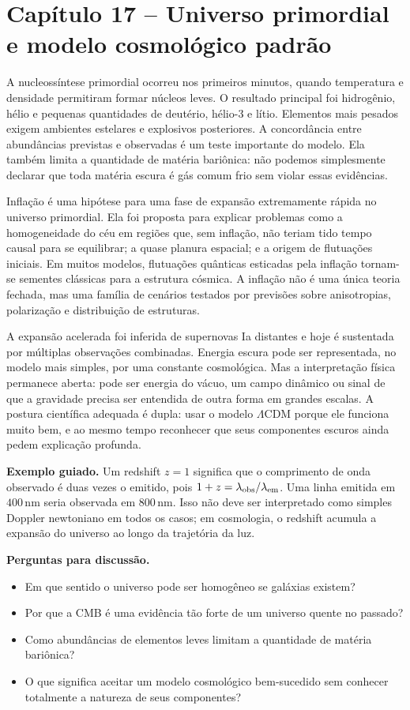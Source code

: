 \documentclass[11pt,a4paper]{article}
\begin{document}
\section*{Capítulo 17 -- Universo primordial e modelo cosmológico padrão}
A nucleossíntese primordial ocorreu nos primeiros minutos, quando temperatura e densidade permitiram formar núcleos leves. O resultado principal foi hidrogênio, hélio e pequenas quantidades de deutério, hélio-3 e lítio. Elementos mais pesados exigem ambientes estelares e explosivos posteriores. A concordância entre abundâncias previstas e observadas é um teste importante do modelo. Ela também limita a quantidade de matéria bariônica: não podemos simplesmente declarar que toda matéria escura é gás comum frio sem violar essas evidências.

Inflação é uma hipótese para uma fase de expansão extremamente rápida no universo primordial. Ela foi proposta para explicar problemas como a homogeneidade do céu em regiões que, sem inflação, não teriam tido tempo causal para se equilibrar; a quase planura espacial; e a origem de flutuações iniciais. Em muitos modelos, flutuações quânticas esticadas pela inflação tornam-se sementes clássicas para a estrutura cósmica. A inflação não é uma única teoria fechada, mas uma família de cenários testados por previsões sobre anisotropias, polarização e distribuição de estruturas.

A expansão acelerada foi inferida de supernovas Ia distantes e hoje é sustentada por múltiplas observações combinadas. Energia escura pode ser representada, no modelo mais simples, por uma constante cosmológica. Mas a interpretação física permanece aberta: pode ser energia do vácuo, um campo dinâmico ou sinal de que a gravidade precisa ser entendida de outra forma em grandes escalas. A postura científica adequada é dupla: usar o modelo $\Lambda$CDM porque ele funciona muito bem, e ao mesmo tempo reconhecer que seus componentes escuros ainda pedem explicação profunda.

\textbf{Exemplo guiado.} Um redshift $z=1$ significa que o comprimento de onda observado é duas vezes o emitido, pois $1+z=\lambda_{\rm obs}/\lambda_{\rm em}$. Uma linha emitida em $400\,\mathrm{nm}$ seria observada em $800\,\mathrm{nm}$. Isso não deve ser interpretado como simples Doppler newtoniano em todos os casos; em cosmologia, o redshift acumula a expansão do universo ao longo da trajetória da luz.

\textbf{Perguntas para discussão.}
\begin{itemize}
\item Em que sentido o universo pode ser homogêneo se galáxias existem?
\item Por que a CMB é uma evidência tão forte de um universo quente no passado?
\item Como abundâncias de elementos leves limitam a quantidade de matéria bariônica?
\item O que significa aceitar um modelo cosmológico bem-sucedido sem conhecer totalmente a natureza de seus componentes?
\end{itemize}
\end{document}

